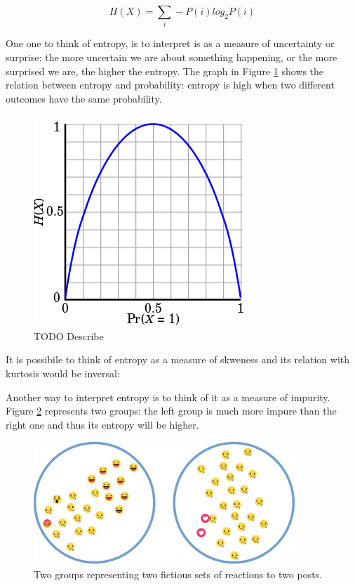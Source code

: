 \documentclass[article,11pt,nofixltx2e]{article}
\begin{document}
\begin{equation}
H(X)=\sum_{i}-P(i)log_{2}P(i)
\end{equation}

One one to think of entropy, is to interpret is as a measure of uncertainty or surprise: the more uncertain we are about something happening, or the more surprised we are, the higher the entropy. The graph in Figure \ref{fig:bentropy-plot} shows the relation between entropy and probability: entropy is high when two different outcomes have the same probability.

\begin{figure}[htb]
\centering
\includegraphics[width=.9\linewidth]{./img/bentropy_plot.png}
\caption{\label{fig:bentropy-plot}TODO Describe}
\end{figure}

It is possibile to think of entropy as a measure of skweness and its relation with kurtosis would be inversal:


Another way to interpret entropy is to think of it as a measure of impurity. Figure \ref{fig:classes-purity} represents two groups: the left group is much more impure than the right one and thus its entropy will be higher.

\begin{figure}[htb]
\centering
\includegraphics[width=.9\linewidth]{./img/classes.png}
\caption{\label{fig:classes-purity}Two groups representing two fictious sets of reactions to two posts.}
\end{figure}
\end{document}
